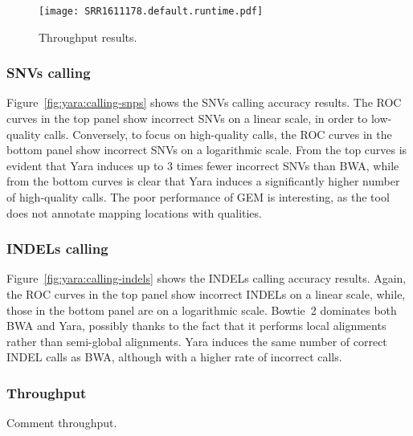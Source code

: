 \begin{figure}[t]
\begin{center}
\caption[Throughput results]{Throughput results.}
\label{fig:yara:throughput}
\texttt{[image: SRR1611178.default.runtime.pdf]}
\end{center}
\end{figure}


\subsubsection{SNVs calling}
Figure~\ref{fig:yara:calling-snps} shows the SNVs calling accuracy results.
The ROC curves in the top panel show incorrect SNVs on a linear scale, in order to low-quality calls.
Conversely, to focus on high-quality calls, the ROC curves in the bottom panel show incorrect SNVs on a logarithmic scale.
From the top curves is evident that Yara induces up to 3 times fewer incorrect SNVs than BWA, while
from the bottom curves is clear that Yara induces a significantly higher number of high-quality calls.
The poor performance of GEM is interesting, as the tool does not annotate mapping locations with qualities.

\subsubsection{INDELs calling}
Figure~\ref{fig:yara:calling-indels} shows the INDELs calling accuracy results.
Again, the ROC curves in the top panel show incorrect INDELs on a linear scale, while, those in the bottom panel are on a logarithmic scale.
Bowtie~2 dominates both BWA and Yara, possibly thanks to the fact that it performs local alignments rather than semi-global alignments.
Yara induces the same number of correct INDEL calls as BWA, although with a higher rate of incorrect calls.

\subsubsection{Throughput}
Comment throughput.




